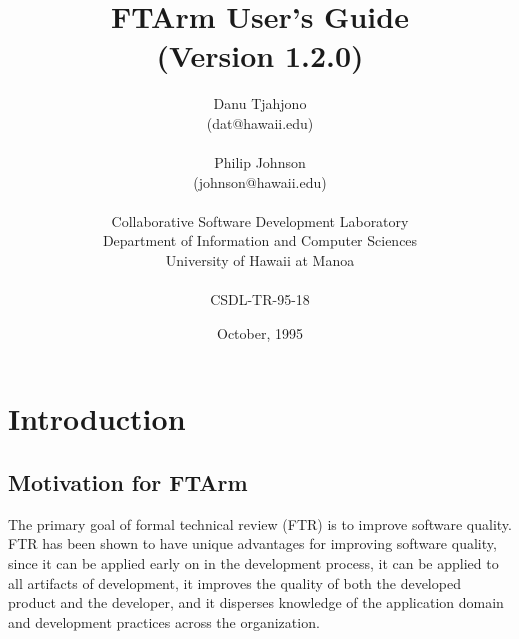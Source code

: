 



\title{FTArm User's Guide \\
{\normalsize (Version 1.2.0)}}
\author 
{Danu Tjahjono \\
 (dat@hawaii.edu) \\
 \\
Philip Johnson \\
(johnson@hawaii.edu)\\
\\
Collaborative Software Development Laboratory\\
Department of Information and Computer Sciences\\
University of Hawaii at Manoa\\
\\
CSDL-TR-95-18}
\date {October, 1995}  %
\maketitle
\newpage
\tableofcontents
\newpage

\section {Introduction}

\subsection {Motivation for FTArm}
The primary goal of formal technical review (FTR) is to improve
software quality. FTR has been shown to have unique advantages for
improving software quality, since it can be applied early on in the
development process, it can be applied to all artifacts of
development, it improves the quality of both the developed product and
the developer, and it disperses knowledge of the application domain
and development practices across the organization.

